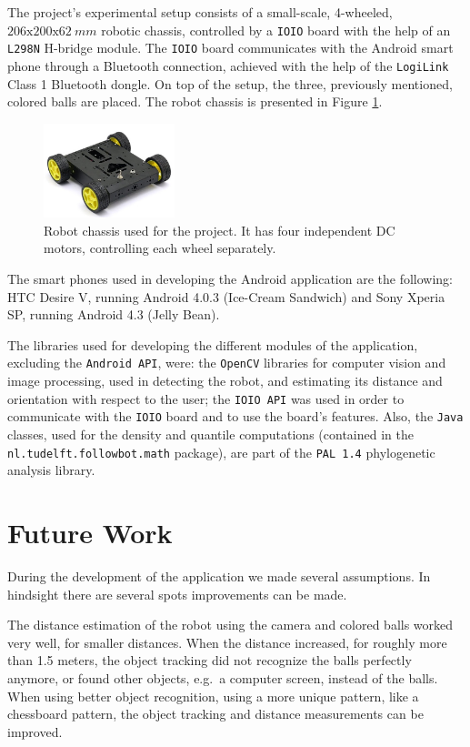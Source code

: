 \documentclass[journal]{IEEEtran}
\let\MYoriglatexcaption\caption
\renewcommand{\caption}[2][\relax]{\MYoriglatexcaption[#2]{#2}}
\begin{document}
The project's experimental setup consists of a small-scale, 4-wheeled, $206\mathrm{x}200\mathrm{x}62\ mm$ robotic chassis, controlled by a \texttt{IOIO} board with the help of an \texttt{L298N} H-bridge module. The \texttt{IOIO} board communicates with the Android smart phone through a Bluetooth connection, achieved with the help of the \texttt{LogiLink} Class 1 Bluetooth dongle. On top of the setup, the three, previously mentioned, colored balls are placed. The robot chassis is presented in Figure \ref{fig:robot}.
%
\begin{figure}[htpb]
 \centering
  \includegraphics[width=1.5in]{images/robot}
  \caption{Robot chassis used for the project. It has four independent DC motors, controlling each wheel separately.}
  \label{fig:robot}
\end{figure}
%
The smart phones used in developing the Android application are the following: HTC Desire V, running Android 4.0.3 (Ice-Cream Sandwich) and Sony Xperia SP, running Android 4.3 (Jelly Bean).

The libraries used for developing the different modules of the application, excluding the \texttt{Android API}, were: the \texttt{OpenCV} libraries for computer vision and image processing, used in detecting the robot, and estimating its distance and orientation with respect to the user; the \texttt{IOIO API} was used in order to communicate with the \texttt{IOIO} board and to use the board's features. Also, the \texttt{Java} classes, used for the density and quantile computations (contained in the \texttt{nl.tudelft.followbot.math} package), are part of the \texttt{PAL 1.4} phylogenetic analysis library.

\section{Future Work}

During the development of the application we made several assumptions. In
hindsight there are several spots improvements can be made.

The distance estimation of the robot using the camera and colored balls worked
very well, for smaller distances. When the distance increased, for roughly
more than 1.5 meters, the object tracking did not recognize the balls perfectly
anymore, or found other objects, e.g.\ a computer screen, instead of the balls.
When using better object recognition, using a more unique pattern, like a
chessboard pattern, the object tracking and distance measurements can be improved.
\end{document}
